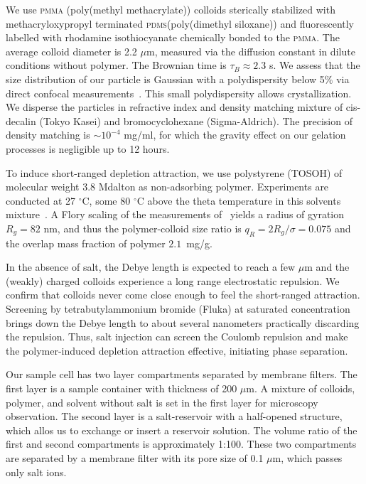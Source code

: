 \documentclass[preprint,amsmath,amssymb,superscriptaddress]{revtex4}
\begin{document}
We use \textsc{pmma} (poly(methyl methacrylate)) colloids sterically stabilized with methacryloxypropyl terminated \textsc{pdms}(poly(dimethyl siloxane)) and fluorescently labelled with rhodamine isothiocyanate chemically bonded to the \textsc{pmma}. 
The average colloid diameter is 2.2 $\mu$m, measured via the diffusion constant in dilute conditions without polymer. The Brownian time is $\tau_B \approx 2.3$ s. 
We assess that the size distribution of our particle is Gaussian with a polydispersity below 5\% via direct confocal measurements~\cite{Leocmach2013}.
This small polydispersity allows crystallization.
We disperse the particles in refractive index and density matching mixture of cis-decalin (Tokyo Kasei) and bromocyclohexane (Sigma-Aldrich). 
The precision of density matching is $\sim 10^{-4}$ mg/ml, for which the gravity effect on our gelation processes is negligible up to 12 hours.

To induce short-ranged depletion attraction, we use polystyrene (TOSOH) of molecular weight 3.8 Mdalton as non-adsorbing polymer. 
Experiments are conducted at 27 $^\circ$C, some 80 $^\circ$C above the theta temperature in this solvents mixture~\cite{Royall2007}. A Flory scaling of the measurements of~\cite{lu2008gelation} yields a radius of gyration $R_g=82$ nm, and thus the polymer-colloid size ratio is $q_R=2R_g/\sigma=0.075$ and the overlap mass fraction of polymer $2.1$~mg/g.

In the absence of salt, the Debye length is expected to reach a few $\mu$m and the (weakly) charged colloids experience a long range electrostatic repulsion. We confirm that colloids never come close enough to feel the short-ranged attraction. Screening by tetrabutylammonium bromide (Fluka) at saturated concentration brings down the Debye length to about several nanometers practically discarding the repulsion. 
Thus, salt injection can screen the Coulomb repulsion and make the polymer-induced depletion attraction effective, initiating phase separation. 

Our sample cell has two layer compartments separated by membrane filters. The first layer is a sample container with thickness of 200 $\mu$m. A mixture of colloids, polymer, and solvent without salt is  set in the first layer for microscopy observation. The second layer is a salt-reservoir with a half-opened structure, which allos us to exchange or insert a reservoir solution. The volume ratio of the first and second compartments is approximately 1:100. These two compartments are separated by a membrane filter with its pore size of 0.1 $\mu$m, which passes only salt ions. 
\end{document}
